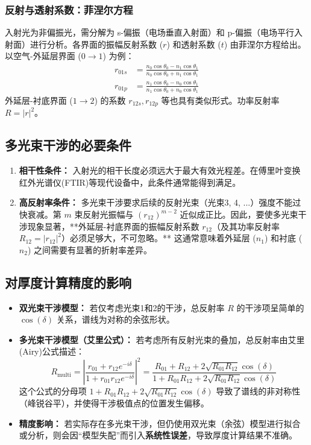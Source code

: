 \documentclass[UTF8, 11pt]{ctexart}
\begin{document}
\subsubsection{反射与透射系数：菲涅尔方程}
入射光为非偏振光，需分解为 s-偏振（电场垂直入射面）和 p-偏振（电场平行入射面）进行分析。各界面的振幅反射系数 ($r$) 和透射系数 ($t$) 由菲涅尔方程给出。以空气-外延层界面 ($0\to1$) 为例：
\begin{align}
    r_{01s} &= \frac{n_0\cos\theta_0 - n_1\cos\theta_1}{n_0\cos\theta_0 + n_1\cos\theta_1} \\
    r_{01p} &= \frac{n_1\cos\theta_0 - n_0\cos\theta_1}{n_1\cos\theta_0 + n_0\cos\theta_1}
\end{align}
外延层-衬底界面 ($1\to2$) 的系数 $r_{12s}, r_{12p}$ 等也具有类似形式。功率反射率 $R=|r|^2$。

\subsection{多光束干涉的必要条件}
\begin{enumerate}
    \item \textbf{相干性条件：} 入射光的相干长度必须远大于最大有效光程差。在傅里叶变换红外光谱仪(FTIR)等现代设备中，此条件通常能得到满足。
    \item \textbf{高反射率条件：} 多光束干涉要求后续的反射光束（光束3, 4, ...）强度不能过快衰减。第 $m$ 束反射光振幅与 $(r_{12})^{m-2}$ 近似成正比。因此，要使多光束干涉现象显著，**外延层-衬底界面的振幅反射系数 $r_{12}$（及其功率反射率 $R_{12}=|r_{12}|^2$）必须足够大，不可忽略。** 这通常意味着外延层 ($n_1$) 和衬底 ($n_2$) 之间需要有显著的折射率差异。
\end{enumerate}

\subsection{对厚度计算精度的影响}
\begin{itemize}
    \item \textbf{双光束干涉模型：} 若仅考虑光束1和2的干涉，总反射率 $R$ 的干涉项呈简单的 $\cos(\delta)$ 关系，谱线为对称的余弦形状。
    \item \textbf{多光束干涉模型（艾里公式）：} 若考虑所有反射光束的叠加，总反射率由艾里(Airy)公式描述：
    \begin{equation}
        R_{\text{multi}} = \left| \frac{r_{01} + r_{12}e^{-i\delta}}{1 + r_{01}r_{12}e^{-i\delta}} \right|^2 = \frac{R_{01} + R_{12} + 2\sqrt{R_{01}R_{12}}\cos(\delta)}{1 + R_{01}R_{12} + 2\sqrt{R_{01}R_{12}}\cos(\delta)}
    \end{equation}
    这个公式的分母项 $1+R_{01}R_{12}+2\sqrt{R_{01}R_{12}}\cos(\delta)$ 导致了谱线的非对称性（峰锐谷平），并使得干涉极值点的位置发生偏移。
    \item \textbf{精度影响：} 若实际存在多光束干涉，但仍使用双光束（余弦）模型进行拟合或分析，则会因“模型失配”而引入\textbf{系统性误差}，导致厚度计算结果不准确。
\end{itemize}
\end{document}
